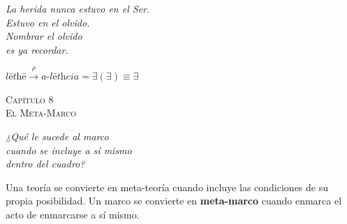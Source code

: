 \documentclass[10pt, openany, oneside]{book}
\renewcommand{\large}{\fontsize{11.5}{14}\selectfont}
\renewcommand{\huge}{\fontsize{17}{21}\selectfont}
\begin{document}
\vspace{0.5em}

\begin{center}
    \itshape
    La herida nunca estuvo en el Ser.\\
    Estuvo en el olvido.\\[0.8em]
    Nombrar el olvido\\
    es ya recordar.
\end{center}

\vspace{0.5em}

\begin{center}
    $\textit{l\={e}th\={e}} \xrightarrow{\rho} \textit{a-l\={e}theia} = \exists(\exists) \equiv \exists$
\end{center}

%
%
%
%

\newpage

\begin{center}
    {\huge\scshape Capítulo 8}\\[0.3em]
    {\large\scshape El Meta-Marco}
\end{center}

\vspace{1.5em}

\begin{center}
    \itshape
    ¿Qué le sucede al marco\\
    cuando se incluye a sí mismo\\
    dentro del cuadro?
\end{center}

\vspace{2em}


\noindent Una teoría se convierte en meta-teoría cuando incluye las condiciones de su propia posibilidad. Un marco se convierte en \textbf{meta-marco} cuando enmarca el acto de enmarcarse a sí mismo.
\end{document}
